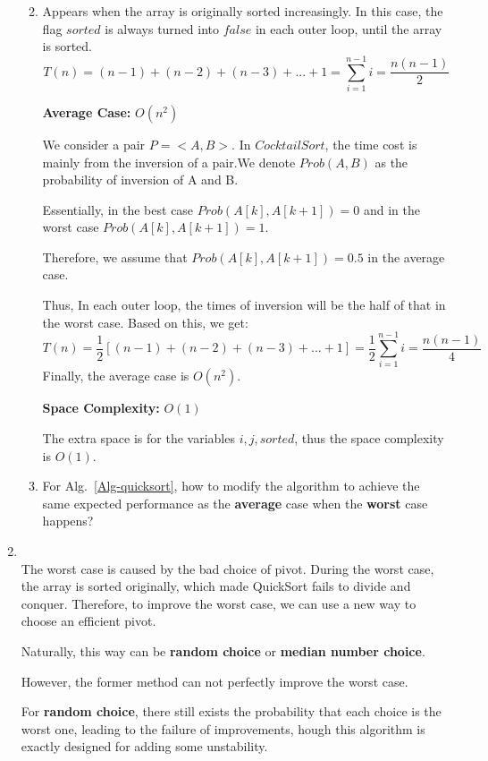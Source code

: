 \documentclass[12pt,a4paper]{article}
\makeatletter
\newtheorem*{solution}{Solution}
\theoremstyle{definition}
\renewenvironment{solution}[1][Solution] {\par\pushQED{\qed}\normalfont\topsep6\p@\@plus6\p@\relax\trivlist\item[\hskip\labelsep\bfseries#1\@addpunct{.}]\ignorespaces}{\popQED\endtrivlist\@endpefalse} \makeatother
\makeatother
\begin{document}
\begin{enumerate}
\begin{enumerate}
\begin{solution}
Appears when the array is originally sorted increasingly. In this case, the flag $sorted$ is always turned into $false$ in each outer loop, until the array is sorted.
$$
\displaystyle T(n) = (n-1) + (n-2) + (n-3) + ... + 1 = \sum_{i=1}^{n-1}i = \frac{n(n-1)}{2}
$$

\textbf{Average Case: }$O(n^2)$

We consider a pair $P=<A, B>$. In $CocktailSort$, the time cost is mainly from the inversion of a pair.We denote $Prob(A, B)$ as the probability of inversion of A and B.

Essentially, in the best case $Prob(A[k], A[k+1])=0$ and in the worst case $Prob(A[k], A[k+1])=1$.

Therefore, we assume that $Prob(A[k],A[k+1])=0.5$ in the average case.

Thus, In each outer loop, the times of inversion will be the half of that in the worst case. Based on this, we get:
$$
\displaystyle T(n) = \frac{1}{2}[(n-1) + (n-2) + (n-3) + ... + 1] = \frac{1}{2}\sum_{i=1}^{n-1}i = \frac{n(n-1)}{4}
$$
Finally, the average case is $O(n^2)$.

\textbf{Space Complexity: }$O(1)$

The extra space is for the variables $i, j, sorted$, thus the space complexity is $O(1)$.
\end{solution}

\item For Alg.~\ref{Alg-quicksort}, how to modify the algorithm to achieve the same expected performance as the \textbf{average} case when the \textbf{worst} case happens?
\end{enumerate} 

    \begin{solution}
    ~\\
The worst case is caused by the bad choice of pivot. During the worst case, the array is sorted originally, which made QuickSort fails to divide and conquer. Therefore, to improve the worst case, we can use a new way to choose an efficient pivot. 

Naturally, this way can be \textbf{random choice} or \textbf{median number choice}.

However, the former method can not perfectly improve the worst case.

For \textbf{random choice}, there still exists the probability that each choice is the worst one, leading to the failure of improvements, hough this algorithm is exactly designed for adding some unstability.


\end{solution}
\end{enumerate}
\end{document}
